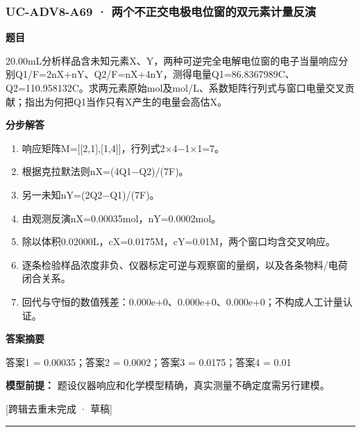 \documentclass[UTF8,11pt,a4paper]{ctexart}
\begin{document}
\subsubsection*{UC-ADV8-A69 · 两个不正交电极电位窗的双元素计量反演}
\noindent\textbf{题目}\par
20.00mL分析样品含未知元素X、Y，两种可逆完全电解电位窗的电子当量响应分别Q1/F=2nX+nY、Q2/F=nX+4nY，测得电量Q1=86.8367989C、Q2=110.958132C。求两元素原始mol及mol/L、系数矩阵行列式与窗口电量交叉贡献；指出为何把Q1当作只有X产生的电量会高估X。\par
\medskip\noindent\textbf{分步解答}
\begin{enumerate}
\item 响应矩阵M=[[2,1],[1,4]]，行列式2×4−1×1=7。
\item 根据克拉默法则nX=(4Q1−Q2)/(7F)。
\item 另一未知nY=(2Q2−Q1)/(7F)。
\item 由观测反演nX=0.00035mol，nY=0.0002mol。
\item 除以体积0.02000L，cX=0.0175M，cY=0.01M，两个窗口均含交叉响应。
\item 逐条检验样品浓度非负、仪器标定可逆与观察窗的量纲，以及各条物料/电荷闭合关系。
\item 回代与守恒的数值残差：0.000e+0、0.000e+0、0.000e+0；不构成人工计量认证。
\end{enumerate}
\noindent\textbf{答案摘要}\par
答案1 = 0.00035；答案2 = 0.0002；答案3 = 0.0175；答案4 = 0.01\par
\noindent\textbf{模型前提：}
题设仪器响应和化学模型精确，真实测量不确定度需另行建模。\par
\noindent\textcolor{red!65!black}{[跨辑去重未完成 · 草稿]} \par
\medskip\hrule\medskip
{}
\end{document}
